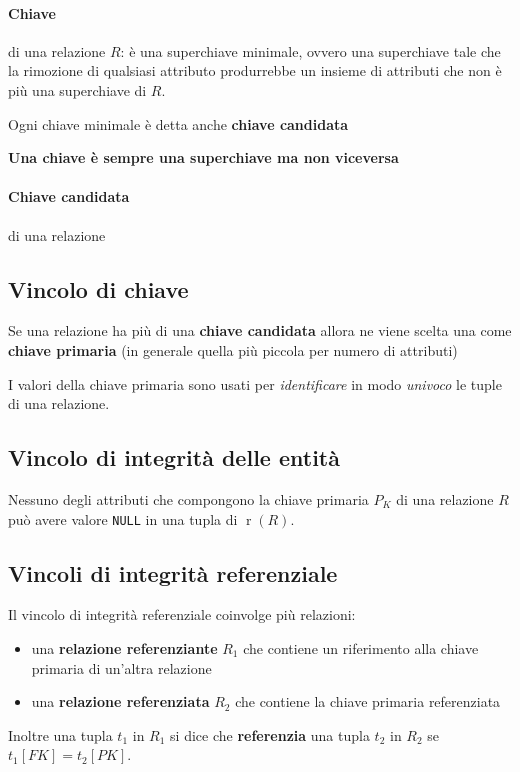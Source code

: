         \paragraph{Chiave} di una relazione $ R $: è una superchiave minimale, ovvero una superchiave tale che la rimozione di qualsiasi attributo produrrebbe un insieme di attributi che non è più una superchiave di $ R $.
        
            Ogni chiave minimale è detta anche \textbf{chiave candidata}
    
        \textbf{Una chiave è sempre una superchiave ma non viceversa}
        \paragraph{Chiave candidata} di una relazione 
    \subsection{Vincolo di chiave}
        Se una relazione ha più di una \textbf{chiave candidata} allora ne viene scelta una come \textbf{chiave primaria} (in generale quella più piccola per numero di attributi)

        I valori della chiave primaria sono usati per \textit{identificare} in modo \textit{univoco} le tuple di una relazione.

    \subsection{Vincolo di integrità delle entità}
        Nessuno degli attributi che compongono la chiave primaria $ P_K $ di una relazione $ R $ può avere valore \texttt{NULL} in una tupla di $ \operatorname{r}(R) $.
    \subsection{Vincoli di integrità referenziale}
        Il vincolo di integrità referenziale coinvolge più relazioni:
        \begin{itemize}
            \item una \textbf{relazione referenziante} $ R_1 $ che contiene un riferimento alla chiave primaria di un'altra relazione
            \item una \textbf{relazione referenziata} $ R_2 $ che contiene la chiave primaria referenziata
        \end{itemize}
        Inoltre una tupla $ t_1 $ in $ R_1 $ si dice che \textbf{referenzia} una tupla $ t_2 $ in $ R_2 $ se $t_1[FK] = t_2[PK] $.
        

